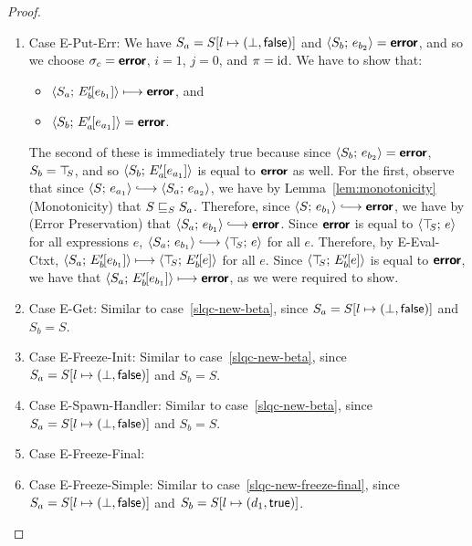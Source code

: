 \begin{proof}
\begin{enumerate}
\begin{enumerate}
    \item \label{slqc-new-put-err}Case {\sc E-Put-Err}: We have $S_a =
      S[l \mapsto (\bot, \textsf{false})]$ and $\langle S_b;\, e_{b_2} \rangle =
      \textbf{\textsf{error}}$, and so we choose $\sigma_c = \textbf{\textsf{error}}$, $i = 1$, $j = 0$,
      and $\pi = \mathrm{id}$.  We have to show that:
      \begin{itemize}
      \item $\langle S_a;\, E'_b\hspace{-1mm}\left[e_{b_1}\right] \rangle \longmapsto
        \textbf{\textsf{error}}$, and
      \item
        $\langle S_b;\, E'_a\hspace{-1mm}\left[e_{a_1}\right] \rangle = \textbf{\textsf{error}}$.
      \end{itemize}

      The second of these is immediately true because since
      $\langle S_b;\, e_{b_2} \rangle = \textbf{\textsf{error}}$, $S_b = \top\hspace{-0.85mm}_{S}$, and so
      $\langle S_b;\, E'_a\hspace{-1mm}\left[e_{a_1}\right] \rangle$ is equal to $\textbf{\textsf{error}}$ as
      well.  For the first, observe that since $\config{S}{e_{a_1}}
      \parstepsto \config{S_a}{e_{a_2}}$, we have by
      Lemma~\ref{lem:monotonicity} (Monotonicity) that
      $S \sqsubseteq_S S_a$.  Therefore, since $\config{S}{e_{b_1}}
      \parstepsto \error$, we have by
      (Error Preservation)
      that $\config{S_a}{e_{b_1}} \parstepsto \error$.  Since $\textbf{\textsf{error}}$
      is equal to $\langle \top\hspace{-0.85mm}_{S};\, e \rangle$ for all expressions $e$,
      $\config{S_a}{e_{b_1}} \parstepsto \config{\topS}{e}$ for all
      $e$.  Therefore, by {\sc E-Eval-Ctxt},
      $\langle S_a;\, E'_b\hspace{-1mm}\left[e_{b_1}\right] \rangle \longmapsto
      \langle \top\hspace{-0.85mm}_{S};\, E'_b\hspace{-1mm}\left[e\right] \rangle$ for all $e$.  Since
      $\langle \top\hspace{-0.85mm}_{S};\, E'_b\hspace{-1mm}\left[e\right] \rangle$ is equal to $\textbf{\textsf{error}}$, we
      have that $\langle S_a;\, E'_b\hspace{-1mm}\left[e_{b_1}\right] \rangle \longmapsto
      \textbf{\textsf{error}}$, as we were required to show.

    \item \label{slqc-new-get}Case {\sc E-Get}: Similar to
      case~\ref{slqc-new-beta}, since $S_a =
      S[l \mapsto (\bot, \textsf{false})]$ and $S_b = S$.
    \item \label{slqc-new-freeze-init}Case {\sc E-Freeze-Init}:
      Similar to case~\ref{slqc-new-beta}, since $S_a =
      S[l \mapsto (\bot, \textsf{false})]$ and $S_b = S$.
    \item \label{slqc-new-spawn-handler}Case {\sc E-Spawn-Handler}:
      Similar to case~\ref{slqc-new-beta}, since $S_a =
      S[l \mapsto (\bot, \textsf{false})]$ and $S_b = S$.
    \item \label{slqc-new-freeze-final}Case {\sc E-Freeze-Final}: \TODO{}
    \item \label{slqc-new-freeze-simple}Case {\sc E-Freeze-Simple}:
      Similar to case~\ref{slqc-new-freeze-final}, since $S_a =
      S[l \mapsto (\bot, \textsf{false})]$ and $S_b =
      S[l \mapsto (d_1, \textsf{true})]$.


\end{enumerate}
\end{enumerate}
\end{proof}
